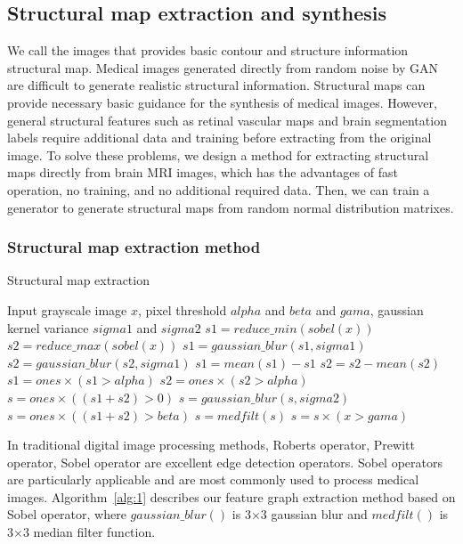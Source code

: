 \documentclass[runningheads]{llncs}
\begin{document}
	\subsection{Structural map extraction and synthesis}
	We call the images that provides basic contour and structure information structural map. Medical images generated directly from random noise by GAN are difficult to generate realistic structural information. Structural maps can provide necessary basic guidance for the synthesis of medical images. However, general structural features such as retinal vascular maps\cite{41costa2017towards} and brain segmentation labels \cite{4shin2018medical}require additional data and training before extracting from the original image. To solve these problems, we design a method for extracting structural maps directly from brain MRI images, which has the advantages of fast operation, no training, and no additional required data. Then, we can train a generator to generate structural maps from random normal distribution matrixes.
	\subsubsection{Structural map extraction method}
	\begin{algorithm}
		\caption{Structural map extraction}
		\label{alg:1}
		\begin{multicols}{2}
			\begin{algorithmic}[1]
				\State Input grayscale image $x$,
				pixel threshold $alpha$ and $beta$ and $gama$,
				gaussian kernel variance $sigma1$ and $sigma2$
				\State $s1 = reduce\_min(sobel(x))$
				\State $s2 = reduce\_max(sobel(x))$
				\State $s1 = gaussian\_blur(s1,sigma1)$
				\State $s2 = gaussian\_blur(s2,sigma1)$
				\State $s1 = mean(s1) - s1$
				\State $s2 = s2 - mean(s2)$
				\State $s1 = ones \times (s1 > alpha)$
				\State $s2 = ones \times (s2 > alpha)$
				\State $s = ones \times ((s1 + s2)> 0)$
				\State $s = gaussian\_blur(s,sigma2)$
				\State $s = ones \times ((s1 + s2)> beta)$
				\State $s = medfilt(s)$
				\State $s = s \times (x > gama)$
			\end{algorithmic}  
		\end{multicols}
	\end{algorithm}
	In traditional digital image processing methods, Roberts operator\cite{145Roberts}, Prewitt operator\cite{146prewitt}, Sobel operator\cite{147Sobel} are excellent edge detection operators. Sobel operators are particularly applicable and are most commonly used to process medical images. Algorithm~\ref{alg:1} describes our feature graph extraction method based on Sobel operator, where  $gaussian\_blur()$ is 3$\times$3 gaussian blur and  $medfilt()$ is 3$\times$3 median filter function.
\end{document}
